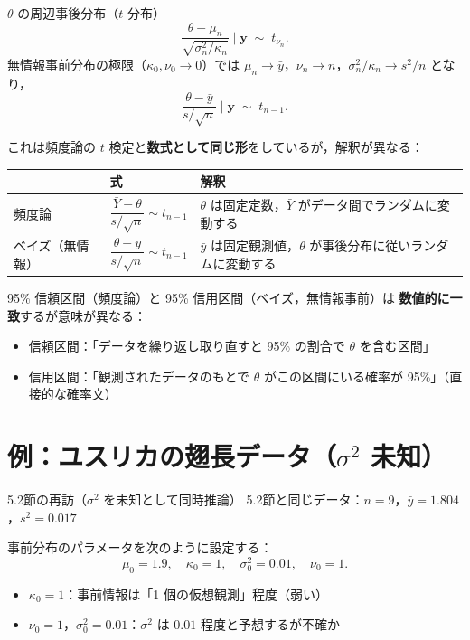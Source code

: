 \documentclass[lualatex,ja=standard,a4paper,12pt]{bxjsarticle}
\begin{document}
\begin{thmbox}{$\theta$ の周辺事後分布（$t$ 分布）}
\[
  \frac{\theta - \mu_n}{\sqrt{\sigma_n^2/\kappa_n}} \;\Bigg|\; \mathbf{y}
  \;\sim\; t_{\nu_n}.
\]
無情報事前分布の極限（$\kappa_0, \nu_0 \to 0$）では
$\mu_n \to \bar{y}$，$\nu_n \to n$，$\sigma_n^2/\kappa_n \to s^2/n$ となり，
\[
  \frac{\theta - \bar{y}}{s/\sqrt{n}} \;\Bigg|\; \mathbf{y}
  \;\sim\; t_{n-1}.
\]
\end{thmbox}

これは頻度論の $t$ 検定と\textbf{数式として同じ形}をしているが，解釈が異なる：

\begin{center}
\renewcommand{\arraystretch}{1.5}
\begin{tabular}{lp{5cm}p{5.5cm}}
\toprule
 & \textbf{式} & \textbf{解釈} \\
\midrule
頻度論 &
  $\dfrac{\bar{Y} - \theta}{s/\sqrt{n}} \sim t_{n-1}$ &
  $\theta$ は固定定数，$\bar{Y}$ がデータ間でランダムに変動する \\[8pt]
ベイズ（無情報） &
  $\dfrac{\theta - \bar{y}}{s/\sqrt{n}} \sim t_{n-1}$ &
  $\bar{y}$ は固定観測値，$\theta$ が事後分布に従いランダムに変動する \\
\bottomrule
\end{tabular}
\end{center}

\begin{pointbox}
95\% 信頼区間（頻度論）と 95\% 信用区間（ベイズ，無情報事前）は
\textbf{数値的に一致}するが意味が異なる：
\begin{itemize}
  \item 信頼区間：「データを繰り返し取り直すと 95\% の割合で $\theta$ を含む区間」
  \item 信用区間：「観測されたデータのもとで $\theta$ がこの区間にいる確率が 95\%」（直接的な確率文）
\end{itemize}
\end{pointbox}


\section{例：ユスリカの翅長データ（$\sigma^2$ 未知）}

\begin{exbox}{5.2節の再訪（$\sigma^2$ を未知として同時推論）}
5.2節と同じデータ：$n=9$，$\bar{y} = 1.804$，$s^2 = 0.017$

\medskip
事前分布のパラメータを次のように設定する：
\[
  \mu_0 = 1.9, \quad \kappa_0 = 1, \quad \sigma_0^2 = 0.01, \quad \nu_0 = 1.
\]
\begin{itemize}
  \item $\kappa_0 = 1$：事前情報は「1 個の仮想観測」程度（弱い）
  \item $\nu_0 = 1$，$\sigma_0^2 = 0.01$：$\sigma^2$ は $0.01$ 程度と予想するが不確か
\end{itemize}
\end{exbox}
\end{document}
